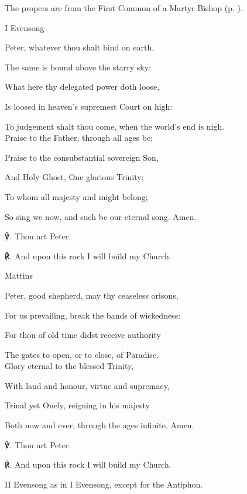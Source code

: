 \begin{rubric}
	The propers are from the First Common of a Martyr Bishop (p. \pageref{CommonMartyrBishopI}).
\end{rubric}


\label{CathedraAntioch}

\begin{paracol}{2}[]
\sloppy
\begin{inhead}
	I Evensong
\end{inhead}
\begin{hangparas}{1.25em}{1}
    Peter, whatever thou shalt bind on earth,
    
    The same is bound above the starry sky;
    
    What here thy delegated power doth loose,
    
    Is loosed in heaven's supremest Court on high:
    
    To judgement shalt thou come, when the world’s end is nigh.\\
    
    Praise to the Father, through all ages be;
    
    Praise to the consubstantial sovereign Son,
    
    And Holy Ghost, One glorious Trinity;
    
    To whom all majesty and might belong;
    
    So sing we now, and such be our eternal song. Amen.\\
    \end{hangparas}
    
    ℣. Thou art Peter.

	℟. And upon this rock I will build my Church.

\switchcolumn

\begin{inhead}
	Mattins
\end{inhead}
\begin{hangparas}{1.25em}{1}
Peter, good shepherd, may thy ceaseless orisons,

For us prevailing, break the bands of wickedness:

For thou of old time didst receive authority

The gates to open, or to close, of Paradise.\\

Glory eternal to the blessed Trinity,

With laud and honour, virtue and supremacy,

Trinal yet Onely, reigning in his majesty

Both now and ever, through the ages infinite. Amen.\\
\end{hangparas}

    ℣. Thou art Peter.

	℟. And upon this rock I will build my Church.

\fussy
\end{paracol}
\begin{rubric}
	II Evensong as in I Evensong, except for the Antiphon.
\end{rubric}


